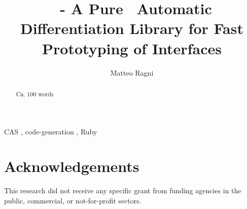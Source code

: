 \documentclass[preprint, 12pt, a4paper]{elsarticle}
\begin{document}
\begin{frontmatter}

\title{\ragnicas~- A Pure \Ruby~Automatic Differentiation Library for Fast Prototyping of Interfaces}

\author[ragni]{Matteo Ragni}
\address[ragni]{Department of Industrial Engineering, University of Trento, 9, Sommarive, Povo di Trento, Italy}

\begin{abstract}

Ca. 100 words

\end{abstract}

\begin{keyword}
CAS \sep{} code-generation \sep{} Ruby
\end{keyword}

\end{frontmatter}

\linenumbers{}








\section*{Acknowledgements}
\label{sec:acknowledgements}
This research did not receive any specific grant from funding agencies in the public, commercial, or not-for-profit sectors.









\end{document}
